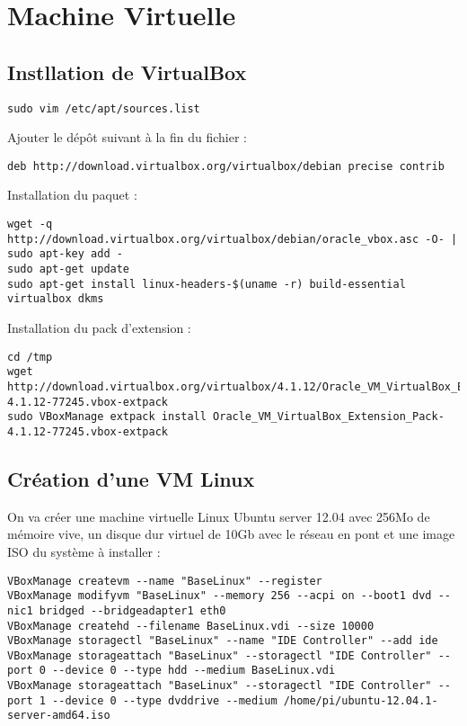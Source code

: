 \section{Machine Virtuelle}

\subsection{Instllation de VirtualBox}

\begin{verbatim}
sudo vim /etc/apt/sources.list
\end{verbatim}

Ajouter le dépôt suivant à la fin du fichier :
\begin{verbatim} 
deb http://download.virtualbox.org/virtualbox/debian precise contrib
\end{verbatim}

Installation du paquet :

\begin{verbatim}
wget -q http://download.virtualbox.org/virtualbox/debian/oracle_vbox.asc -O- | sudo apt-key add -
sudo apt-get update
sudo apt-get install linux-headers-$(uname -r) build-essential virtualbox dkms
\end{verbatim}

Installation du pack d'extension :

\begin{verbatim}
cd /tmp
wget http://download.virtualbox.org/virtualbox/4.1.12/Oracle_VM_VirtualBox_Extension_Pack-4.1.12-77245.vbox-extpack
sudo VBoxManage extpack install Oracle_VM_VirtualBox_Extension_Pack-4.1.12-77245.vbox-extpack
\end{verbatim}

\subsection{Création d'une VM Linux}

On va créer une machine virtuelle Linux Ubuntu server 12.04 avec 256Mo de mémoire vive, un disque dur virtuel de 10Gb avec le réseau en pont et une image ISO du système à installer :

\begin{verbatim}
VBoxManage createvm --name "BaseLinux" --register
VBoxManage modifyvm "BaseLinux" --memory 256 --acpi on --boot1 dvd --nic1 bridged --bridgeadapter1 eth0
VBoxManage createhd --filename BaseLinux.vdi --size 10000
VBoxManage storagectl "BaseLinux" --name "IDE Controller" --add ide
VBoxManage storageattach "BaseLinux" --storagectl "IDE Controller" --port 0 --device 0 --type hdd --medium BaseLinux.vdi
VBoxManage storageattach "BaseLinux" --storagectl "IDE Controller" --port 1 --device 0 --type dvddrive --medium /home/pi/ubuntu-12.04.1-server-amd64.iso
\end{verbatim}

